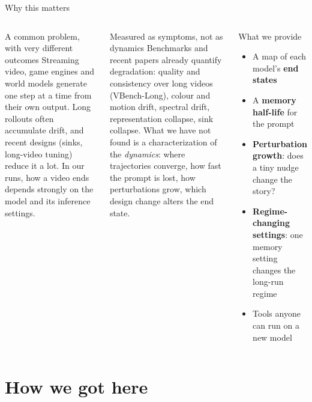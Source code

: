 \documentclass[aspectratio=169,10pt]{beamer}
\begin{document}
\begin{frame}{Why this matters}
\vspace{-6pt}
\begin{columns}[T]
\begin{block}{A common problem, with very different outcomes}
\footnotesize Streaming video, game engines and world models generate one step at a time from their own output. Long rollouts often accumulate drift, and recent designs (sinks, long-video tuning) reduce it a lot. In our runs, how a video ends depends strongly on the model and its inference settings.
\end{block}
\begin{block}{Measured as symptoms, not as dynamics}
\footnotesize Benchmarks and recent papers already quantify degradation: quality and consistency over long videos (VBench-Long), colour and motion drift, spectral drift, representation collapse, sink collapse. What we have not found is a characterization of the \emph{dynamics}: where trajectories converge, how fast the prompt is lost, how perturbations grow, which design change alters the end state.
\end{block}
\begin{block}{What we provide}
\begin{itemize}\footnotesize
  \item A map of each model's \textbf{end states}
  \item A \textbf{memory half-life} for the prompt
  \item \textbf{Perturbation growth}: does a tiny nudge change the story?
  \item \textbf{Regime-changing settings}: one memory setting changes the long-run regime
  \item Tools anyone can run on a new model
\end{itemize}
\end{block}
\end{columns}
\end{frame}

\section{How we got here}
\end{document}
